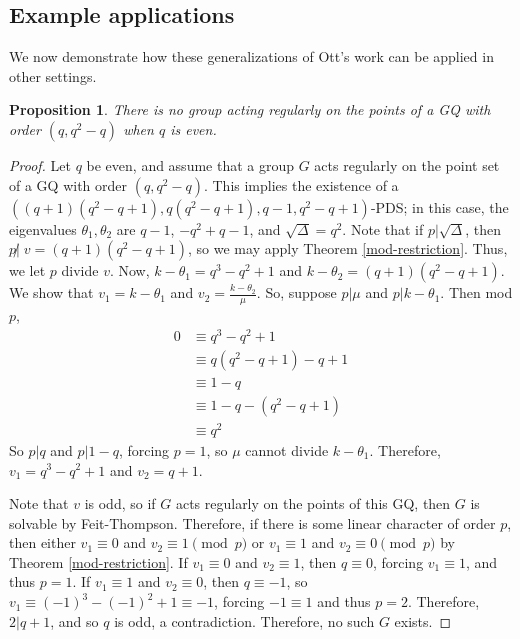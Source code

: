 \documentclass[12pt]{amsproc} %
\newtheorem{prop}[thm]{Proposition}
\theoremstyle{definition}\newtheorem{defn}[thm]{Definition}
\theoremstyle{definition}\newtheorem{rem}[thm]{Remark}
\theoremstyle{definition}\newtheorem{ex}[thm]{Example}
\begin{document}
\subsection{Example applications}
\label{subsec:applications}

We now demonstrate how these generalizations of Ott's work can be applied in other settings.

\begin{prop}\label{odd-order-GQ}
There is no group acting regularly on the points of a GQ with order $(q,q^2-q)$ when $q$ is even.
\end{prop}
	\begin{proof}
	Let $q$ be even, and assume that a group $G$ acts regularly on the point set of a GQ with order $(q, q^2 - q)$. This implies the existence of a $((q+1)(q^2-q+1), q(q^2-q+1), q-1, q^2-q+1)$-PDS; in this case, the eigenvalues $\theta_1, \theta_2$ are $q-1$, $-q^2+q-1$, and $\sqrt\Delta=q^2$. Note that if $p|\sqrt\Delta$, then $p\not|\; v = (q+1)(q^2-q+1)$, so we may apply Theorem \ref{mod-restriction}. Thus, we let $p$ divide $v$. Now, $k-\theta_1 = q^3-q^2+1$ and $k-\theta_2 = (q+1)(q^2-q+1)$. We show that $v_1 = k-\theta_1$ and $v_2 = \frac{k-\theta_2}{\mu}$. So, suppose $p|\mu$ and $p|k-\theta_1$. Then mod $p$,
		\begin{align*}
		0 &\equiv q^3-q^2+1\\
		  &\equiv q(q^2-q+1) - q + 1\\
		  &\equiv 1-q \\
		  &\equiv 1-q - (q^2-q+1)\\
		  &\equiv q^2
		\end{align*}
	 So $p|q$ and $p|1-q$, forcing $p=1$, so $\mu$ cannot divide $k-\theta_1$. Therefore, $v_1 = q^3-q^2+1$ and $v_2 = q+1$.
	 
	 Note that $v$ is odd, so if $G$ acts regularly on the points of this GQ, then $G$ is solvable by Feit-Thompson. Therefore, if there is some linear character of order $p$, then either $v_1 \equiv 0$ and $v_2\equiv 1\pmod p$ or $v_1\equiv 1$ and $v_2\equiv 0\pmod p$ by Theorem \ref{mod-restriction}. If $v_1 \equiv 0$ and $v_2 \equiv 1$, then $q \equiv 0$, forcing $v_1 \equiv 1$, and thus $p=1$. If $v_1 \equiv 1$ and $v_2 \equiv 0$, then $q \equiv -1$, so $v_1 \equiv (-1)^3 - (-1)^2 + 1 \equiv -1$, forcing $-1 \equiv 1$ and thus $p = 2$. Therefore, $2 | q+1$, and so $q$ is odd, a contradiction. Therefore, no such $G$ exists.
	 \end{proof}
	 
\end{document}
